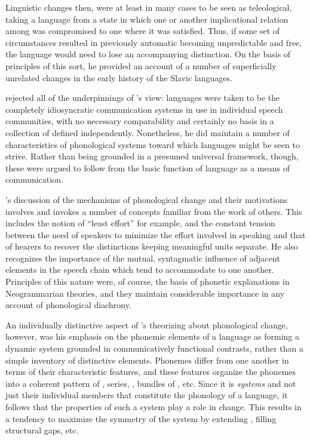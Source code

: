 Linguistic changes then, were at least in many cases to be seen as
teleological, taking a language from a state in which one or another
implicational relation among  was compromised to one where
it was satisfied. Thus, if some set of circumstances resulted in
previously automatic  becoming unpredictable and free, the
language would need to lose an accompanying 
distinction. On the basis of principles of this sort, he provided an
account of a number of superficially unrelated changes in the early
history of the Slavic languages.

{\Martinet} rejected all of the underpinnings of {\Jakobson}'s view:
languages were taken to be the completely idiosyncratic communication
systems in use in individual speech communities, with no necessary
comparability and certainly no basis in a collection of 
defined independently. Nonetheless, he did maintain a number of
characteristics of phonological systems toward which languages might
be seen to strive. Rather than being grounded in a presumed universal
framework, though, these were argued to follow from the basic function
of language as a means of communication.

{\Martinet}'s discussion of the mechanisms of phonological change and
their motivations involves and invokes a number of concepts familiar
from the work of others. This includes the notion of ``least effort''
for example, and the constant tension between the need of speakers to
minimize the effort involved in speaking and that of hearers to
recover the distinctions keeping meaningful units separate. He also
recognizes the importance of the mutual, syntagmatic influence of
adjacent elements in the speech chain which tend to accommodate to one
another. Principles of this nature were, of course, the basis of
phonetic explanations in Neogrammarian theories, and they maintain
considerable importance in any account of phonological diachrony.

An individually distinctive aspect of {\Martinet}'s theorizing about
phonological change, however, was his emphasis on the phonemic
elements of a language as forming a dynamic system grounded in
communicatively functional contrasts, rather than a simple inventory
of distinctive elements. Phonemes differ from one another in terms of
their characteristic features, and these features organize the
phonemes into a coherent pattern of , series, ,
bundles of , etc.  Since it is  \emph{systems} and
not just their individual members that constitute the phonology of a
language, it follows that the properties of such a system play a role
in change. This results in a tendency to maximize the symmetry of the
system by extending , filling structural gaps, etc.

